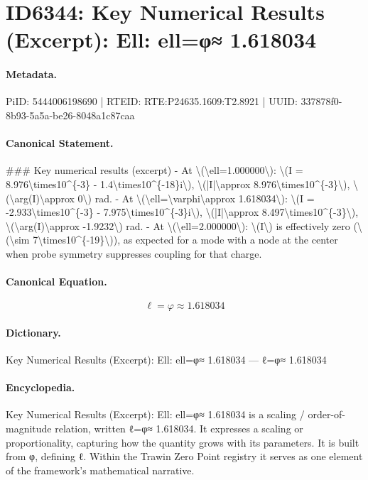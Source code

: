 \section*{ID6344: Key Numerical Results (Excerpt): Ell: ell=φ≈ 1.618034}
\paragraph{Metadata.}
PiID: 5444006198690 | RTEID: RTE:P24635.1609:T2.8921 | UUID: 337878f0-8b93-5a5a-be26-8048a1c87caa

\paragraph{Canonical Statement.}
\#\#\# Key numerical results (excerpt) - At \textbackslash{}(\textbackslash{}ell=1.000000\textbackslash{}): \textbackslash{}(I = 8.976\textbackslash{}times10\textasciicircum{}\{-3\} - 1.4\textbackslash{}times10\textasciicircum{}\{-18\}i\textbackslash{}), \textbackslash{}(|I|\textbackslash{}approx 8.976\textbackslash{}times10\textasciicircum{}\{-3\}\textbackslash{}), \textbackslash{}(\textbackslash{}arg(I)\textbackslash{}approx 0\textbackslash{}) rad. - At \textbackslash{}(\textbackslash{}ell=\textbackslash{}varphi\textbackslash{}approx 1.618034\textbackslash{}): \textbackslash{}(I = -2.933\textbackslash{}times10\textasciicircum{}\{-3\} - 7.975\textbackslash{}times10\textasciicircum{}\{-3\}i\textbackslash{}), \textbackslash{}(|I|\textbackslash{}approx 8.497\textbackslash{}times10\textasciicircum{}\{-3\}\textbackslash{}), \textbackslash{}(\textbackslash{}arg(I)\textbackslash{}approx -1.9232\textbackslash{}) rad. - At \textbackslash{}(\textbackslash{}ell=2.000000\textbackslash{}): \textbackslash{}(I\textbackslash{}) is effectively zero (\textbackslash{}(\textbackslash{}sim 7\textbackslash{}times10\textasciicircum{}\{-19\}\textbackslash{})), as expected for a mode with a node at the center when probe symmetry suppresses coupling for that charge.

\paragraph{Canonical Equation.}
\[
\ell=\varphi\approx 1.618034
\]

\paragraph{Dictionary.}
Key Numerical Results (Excerpt): Ell: ell=φ≈ 1.618034 — ℓ=φ≈ 1.618034

\paragraph{Encyclopedia.}
Key Numerical Results (Excerpt): Ell: ell=φ≈ 1.618034 is a scaling / order-of-magnitude relation, written ℓ=φ≈ 1.618034. It expresses a scaling or proportionality, capturing how the quantity grows with its parameters. It is built from φ, defining ℓ. Within the Trawin Zero Point registry it serves as one element of the framework's mathematical narrative.
